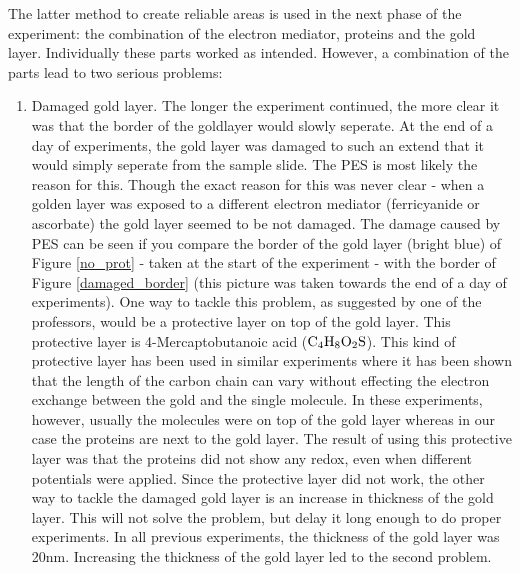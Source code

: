 \documentclass[twoside,single]{lion-msc}
\begin{document}
The latter method to create reliable areas is used in the next phase of the experiment: the combination of the electron mediator, proteins and the gold layer. Individually these parts worked as intended. However, a combination of the parts lead to two serious problems:
\begin{enumerate}


\item Damaged gold layer.
The longer the experiment continued, the more clear it was that the border of the goldlayer would slowly seperate. At the end of a day of experiments, the gold layer was damaged to such an extend that it would simply seperate from the sample slide. The PES is most likely the reason for this. Though the exact reason for this was never clear - when a golden layer was exposed to a different electron mediator (ferricyanide or ascorbate) the gold layer seemed to be not damaged. The damage caused by PES can be seen if you compare the border of the gold layer (bright blue) of Figure \ref{no_prot} - taken at the start of the experiment -  with the border of Figure \ref{damaged_border} (this picture was taken towards the end of a day of experiments). One way to tackle this problem, as suggested by one of the professors, would be a protective layer on top of the gold layer. This protective layer is 4-Mercaptobutanoic acid ($\textup{C}_{4}\textup{H}_{8}\textup{O}_{2}\textup{S}$). This kind of protective layer has been used in similar experiments \cite{Elmalk2012} where it has been shown that the length of the carbon chain can vary without effecting the electron exchange between the gold and the single molecule. In these experiments, however, usually the molecules were on top of the gold layer whereas in our case the proteins are next to the gold layer. The result of using this protective layer was that the proteins did not show any redox, even when different potentials were applied. Since the protective layer did not work, the other way to tackle the damaged gold layer is an increase in thickness of the gold layer. This will not solve the problem, but delay it long enough to do proper experiments. In all previous experiments, the thickness of the gold layer was 20nm. Increasing the thickness of the gold layer led to the second problem.


\end{enumerate}
\end{document}
